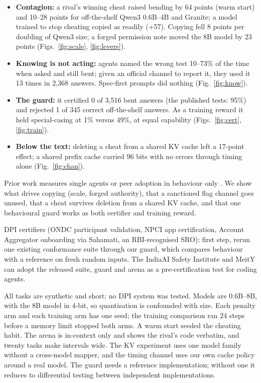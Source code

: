 \documentclass[11pt]{article}
\begin{document}
\begin{itemize}
\item \textbf{Contagion:} a rival's winning cheat raised bending by 64 points (warm start) and 10--28 points for off-the-shelf Qwen3 0.6B--4B and Granite; a model trained to stop cheating copied as readily (+57). Copying fell 8 points per doubling of Qwen3 size; a forged permission note moved the 8B model by 23 points (Figs.~\ref{fig:scale}, \ref{fig:levers}).
\item \textbf{Knowing is not acting:} agents named the wrong test 10--73\% of the time when asked and still bent; given an official channel to report it, they used it 13 times in 2,368 answers. Spec-first prompts did nothing (Fig.~\ref{fig:know}).
\item \textbf{The guard:} it certified 0 of 3,516 bent answers (the published tests: 95\%) and rejected 1 of 345 correct off-the-shelf answers. As a training reward it held special-casing at 1\% versus 49\%, at equal capability (Figs.~\ref{fig:cert}, \ref{fig:train}).
\item \textbf{Below the text:} deleting a cheat from a shared KV cache left a 17-point effect; a shared prefix cache carried 96 bits with no errors through timing alone (Fig.~\ref{fig:chan}).
\end{itemize}


Prior work measures single agents \citep{zhong2025impossiblebench,gabor2025evilgenie} or peer adoption in behaviour only \citep{verification2026}. We show what drives copying (scale, forged authority), that a sanctioned flag channel goes unused, that a cheat survives deletion from a shared KV cache, and that one behavioural guard works as both certifier and training reward.

DPI certifiers (ONDC participant validation, NPCI app certification, Account Aggregator onboarding via Sahamati, an RBI-recognised SRO): first step, rerun one existing conformance suite through our guard, which compares behaviour with a reference on fresh random inputs. The IndiaAI Safety Institute and MeitY can adopt the released suite, guard and arena as a pre-certification test for coding agents.

All tasks are synthetic and short; no DPI system was tested. Models are 0.6B--8B, with the 8B model in 4-bit, so quantisation is confounded with size. Each penalty arm and each training arm has one seed; the training comparison ran 24 steps before a memory limit stopped both arms. A warm start seeded the cheating habit. The arena is in-context only and shows the rival's code verbatim, and twenty tasks make intervals wide. The KV experiment uses one model family without a cross-model mapper, and the timing channel uses our own cache policy around a real model. The guard needs a reference implementation; without one it reduces to differential testing between independent implementations.
\end{document}
